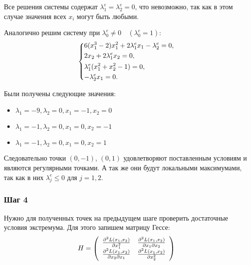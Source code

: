 \documentclass[a4paper, 12pt]{article}   	%
\begin{document}
    Все решения системы содержат $\lambda_1^e = \lambda_2^e = 0$, что невозможно, так как в этом случае значения всех $x_i$ могут быть любыми.
    
    Аналогично решим систему при $\lambda_0^e \neq 0 \quad (\lambda_0^e = 1)$:
    \begin{equation}
        \begin{dcases*}
            6 (x_1^3 - 2)x_1^2 + 2 \lambda_1^e x_1 - \lambda_2^e = 0, \\
            2 x_2 + 2 \lambda_1^e x_2 = 0, \\
            \lambda_1^e(x^2_1 + x^2_2 - 1) = 0, \\
           -\lambda_2^e x_1 = 0.
        \end{dcases*}
    \end{equation}
    
    Были получены следующие значения:
    \begin{itemize}
        \item $\lambda_1 = -9, \lambda_2 = 0, x_1 = -1, x_2 = 0$
        \item $\lambda_1 = -1, \lambda_2 = 0, x_1 = 0, x_2 = -1$
        \item $\lambda_1 = -1, \lambda_2 = 0, x_1 = 0, x_2 = 1$
    \end{itemize}
    
    Следовательно точки $(0, -1)$, $(0, 1)$ удовлетворяют поставленным условиям и являются регулярными точками. А так же они будут локальными максимумами, так как в них $\lambda_j^e \leq 0$ для $j = 1, 2$.

\subsubsection{Шаг 4}
    Нужно для полученных точек на предыдущем шаге проверить достаточные условия экстремума. Для этого запишем матрицу Гессе:
    \begin{equation}
        H = 
        \left(
        \begin{array}{c c}
        \frac{\partial^2 L(x_1, x_2)}{\partial x_1^2} & \frac{\partial^2 L(x_1, x_2)}{\partial x_1 \partial x_2 } \\
        \frac{\partial^2 L(x_1, x_2)}{\partial x_2 \partial x_1 } & \frac{\partial^2 L(x_1, x_2)}{\partial x_2^2}
        \end{array}
        \right)
    \end{equation}
    
\end{document}
